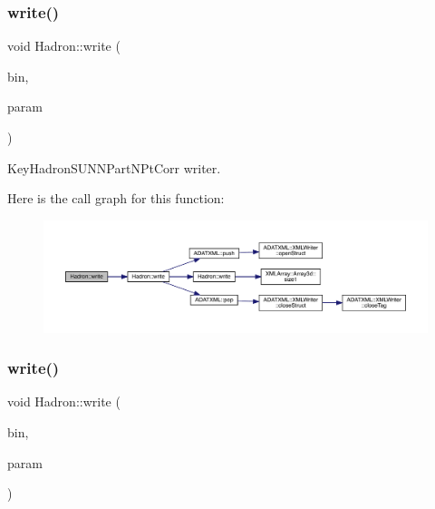\subsubsection{\texorpdfstring{write()}{write()}\hspace{0.1cm}{\footnotesize\ttfamily [55/95]}}
{\footnotesize\ttfamily void Hadron\+::write (\begin{DoxyParamCaption}\item[{\mbox{\hyperlink{classADATIO_1_1BinaryWriter}{Binary\+Writer}} \&}]{bin,  }\item[{const \mbox{\hyperlink{structHadron_1_1KeyHadronSUNNPartNPtCorr__t}{Key\+Hadron\+S\+U\+N\+N\+Part\+N\+Pt\+Corr\+\_\+t}} \&}]{param }\end{DoxyParamCaption})}



Key\+Hadron\+S\+U\+N\+N\+Part\+N\+Pt\+Corr writer. 

Here is the call graph for this function\+:
\nopagebreak
\begin{figure}[H]
\begin{center}
\leavevmode
\includegraphics[width=350pt]{d1/daf/namespaceHadron_a767bdf4c228c06edad1c47918ec75ed3_cgraph}
\end{center}
\end{figure}
\mbox{\label{namespaceHadron_a7b503b82bc88cdec19d5b7173957b35e}} 
\subsubsection{\texorpdfstring{write()}{write()}\hspace{0.1cm}{\footnotesize\ttfamily [56/95]}}
{\footnotesize\ttfamily void Hadron\+::write (\begin{DoxyParamCaption}\item[{\mbox{\hyperlink{classADATIO_1_1BinaryWriter}{Binary\+Writer}} \&}]{bin,  }\item[{const \mbox{\hyperlink{structHadron_1_1ValTimeSlice__t}{Val\+Time\+Slice\+\_\+t}} \&}]{param }\end{DoxyParamCaption})}



